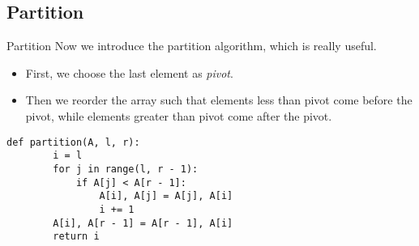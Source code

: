 \documentclass{beamer}
\begin{document}
\subsection{Partition}
\begin{frame}[fragile]{Partition}
  \setlength{\topsep}{0pt}
  \setlength{\partopsep}{0pt}
  Now we introduce the partition algorithm, which is really useful. \pause
  \begin{itemize}
    \item First, we choose the last element as \emph{pivot}. \pause
    \item Then we reorder the array such that elements less than pivot come
    before the pivot, while elements greater than pivot come after the pivot.
    \pause
  \end{itemize}
  \begin{block}{}
    \scriptsize
    \begin{lstlisting}[gobble=4]
    def partition(A, l, r):
        i = l
        for j in range(l, r - 1):
            if A[j] < A[r - 1]:
                A[i], A[j] = A[j], A[i]
                i += 1
        A[i], A[r - 1] = A[r - 1], A[i]
        return i
    \end{lstlisting}
  \end{block}
\end{frame}
\end{document}
